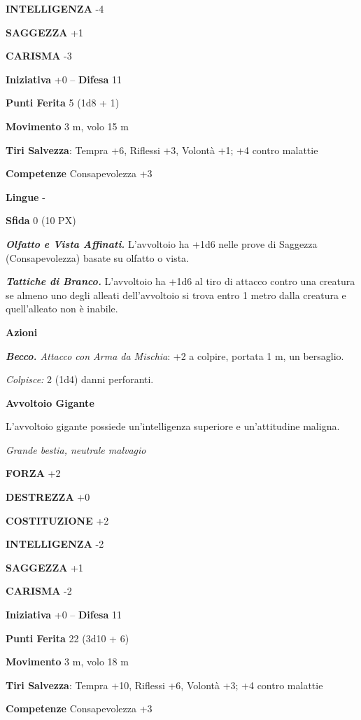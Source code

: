 \begin{multicols}{2}
	\textbf{INTELLIGENZA} -4

	\textbf{SAGGEZZA} +1

	\textbf{CARISMA} -3

	\textbf{Iniziativa} +0 -- \textbf{Difesa} 11

	\textbf{Punti Ferita} 5 (1d8 + 1)

	\textbf{Movimento} 3 m, volo 15 m

	\textbf{Tiri Salvezza}: Tempra +6, Riflessi +3, Volontà +1; +4 contro malattie

	\textbf{Competenze} Consapevolezza +3

	\textbf{Lingue} -

	\textbf{Sfida} 0 (10 PX)

	\textit{\textbf{Olfatto e Vista Affinati.}} L'avvoltoio ha +1d6 nelle prove di Saggezza (Consapevolezza) basate su olfatto o vista.

	\textit{\textbf{Tattiche di Branco.}} L'avvoltoio ha +1d6 al tiro di attacco contro una creatura se almeno uno degli alleati dell'avvoltoio si trova entro 1 metro dalla creatura e quell'alleato non è inabile.

	\textbf{Azioni}

	\textit{\textbf{Becco.} Attacco con Arma da Mischia}: +2 a colpire, portata 1 m, un bersaglio.

	\textit{Colpisce:} 2 (1d4) danni perforanti.

	\medskip\textbf{Avvoltoio Gigante}

	L'avvoltoio gigante possiede un'intelligenza superiore e un'attitudine maligna.

	\textit{Grande bestia, neutrale malvagio}

	\textbf{FORZA} +2

	\textbf{DESTREZZA} +0

	\textbf{COSTITUZIONE} +2

	\textbf{INTELLIGENZA} -2

	\textbf{SAGGEZZA} +1

	\textbf{CARISMA} -2

	\textbf{Iniziativa} +0 -- \textbf{Difesa} 11

	\textbf{Punti Ferita} 22 (3d10 + 6)

	\textbf{Movimento} 3 m, volo 18 m

	\textbf{Tiri Salvezza}: Tempra +10, Riflessi +6, Volontà +3; +4 contro malattie

	\textbf{Competenze} Consapevolezza +3


\end{multicols}
